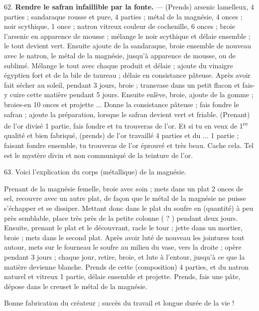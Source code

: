 \documentclass[a4paper, 11pt, oneside, polutonikogreek, french]{article}
\begin{document}
62. \textbf{Rendre le safran infaillible par la fonte.} --- (Prends) arsenic lamelleux, 4 parties ; sandaraque rousse et pure, 4 parties ; métal de la magnésie, 4 onces ; noir scythique, 1 once ; natron vitreux couleur de cochenille, 6 onces ; broie l'arsenic en apparence de mousse ; mélange le noir scythique et délaie ensemble ; le tout devient vert. Ensuite ajoute de la sandaraque, broie ensemble de nouveau avec le natron, le métal de la magnésie, jusqu'à apparence de mousse, ou de sublimé. Mélange le tout avec chaque produit et délaie ; ajoute du vinaigre égyptien fort et de la bile de taureau ; délaie en consistance pâteuse. Après avoir fait sécher au soleil, pendant 3 jours, broie ; transvase dans un petit flacon et fais-y cuire cette matière pendant 5 jours. Ensuite enlève, broie, ajoute de la gomme ; broies-en 10 onces et projette ... Donne la consistance pâteuse ; fais fondre le safran ; ajoute la préparation, lorsque le safran devient vert et friable. (Prenant) de l'or divisé 1 partie, fais fondre et tu trouveras de l'or. Et si tu en veux de 1\textsuperscript{re} qualité et bien fabriqué, (prends) de l'or travaillé 4 parties et du ... 1 partie ; faisant fondre ensemble, tu trouveras de l'or éprouvé et très beau. Cache cela. Tel est le mystère divin et non communiqué de la teinture de l'or.

63. Voici l'explication du corps (métallique) de la magnésie.

Prenant de la magnésie femelle, broie avec soin ; mets dans un plat 2 onces de sel, recouvre avec un autre plat, de façon que le métal de la magnésie ne puisse s'échapper et se dissiper. Mettant donc dans le plat du soufre en (quantité) à peu près semblable, place très près de la petite colonne ( ? ) pendant deux jours. Ensuite, prenant le plat et le découvrant, racle le tour ; jette dans un mortier, broie ; mets dans le second plat. Après avoir luté de nouveau les jointures tout autour, mets sur le fourneau le soufre au milieu du vase, vers la droite ; opère pendant 3 jours ; chaque jour, retire, broie, et lute à l'entour, jusqu'à ce que la matière devienne blanche. Prends de cette (composition) 4 parties, et du natron naturel et vitreux 1 partie, délaie ensemble et projette. Prends, fais une pâte, dépose dans le creuset le métal de la magnésie.

Bonne fabrication du créateur ; succès du travail et longue durée de la vie !

\bigskip
\centerline{\EightStarTaper}
\centerline{\EightStarTaper\EightStarTaper}
\bigskip
\end{document}

